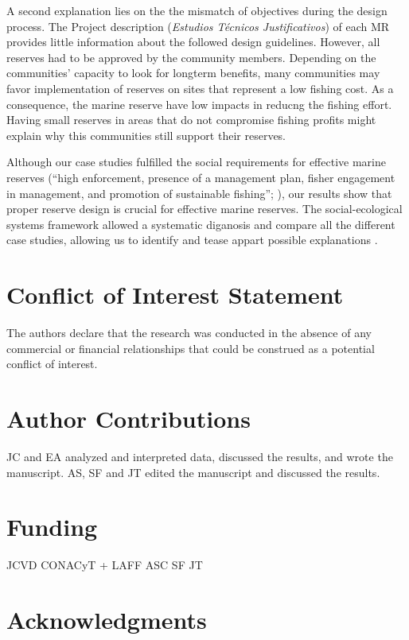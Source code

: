 \documentclass{frontiersSCNS}
\theoremstyle{definition}
\theoremstyle{definition}
\theoremstyle{definition}
\theoremstyle{remark}
\begin{document}
A second explanation lies on the the mismatch of objectives during the
design process. The Project description (\emph{Estudios Técnicos
Justificativos}) of each MR provides little information about the
followed design guidelines. However, all reserves had to be approved by
the community members. Depending on the communities' capacity to look
for longterm benefits, many communities may favor implementation of
reserves on sites that represent a low fishing cost. As a consequence,
the marine reserve have low impacts in reducng the fishing effort.
Having small reserves in areas that do not compromise fishing profits
might explain why this communities still support their reserves.

Although our case studies fulfilled the social requirements for
effective marine reserves (``high enforcement, presence of a management
plan, fisher engagement in management, and promotion of sustainable
fishing''; \citet{difranco_2016-Xw}), our results show that proper
reserve design is crucial for effective marine reserves. The
social-ecological systems framework allowed a systematic diganosis and
compare all the different case studies, allowing us to identify and
tease appart possible explanations \citep{basurto_2013-oq}.

\section*{Conflict of Interest Statement}

The authors declare that the research was conducted in the absence of
any commercial or financial relationships that could be construed as a
potential conflict of interest.

\section*{Author Contributions}

JC and EA analyzed and interpreted data, discussed the results, and
wrote the manuscript. AS, SF and JT edited the manuscript and discussed
the results.

\section*{Funding}

JCVD CONACyT + LAFF ASC SF JT

\section*{Acknowledgments}
\end{document}

